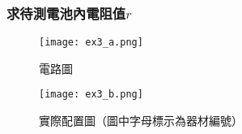 \documentclass[12pt]{article}
\begin{document}
        \begin{center}
        \end{center}
        
        \newpage
        \subsubsection{求待測電池內電阻值$r$}

        \quad

        \begin{figure}[h]
            \begin{minipage}{0.36\textwidth}
                \centering
                \texttt{[image: ex3\_a.png]}
                \caption{電路圖}
                \label{fig:ex3_a}
            \end{minipage}
            \begin{minipage}{0.63\textwidth}
                \centering
                \texttt{[image: ex3\_b.png]}
                \caption{實際配置圖（圖中字母標示為器材編號）}
                \label{fig:ex3_b}
            \end{minipage}
        \end{figure}
\end{document}
